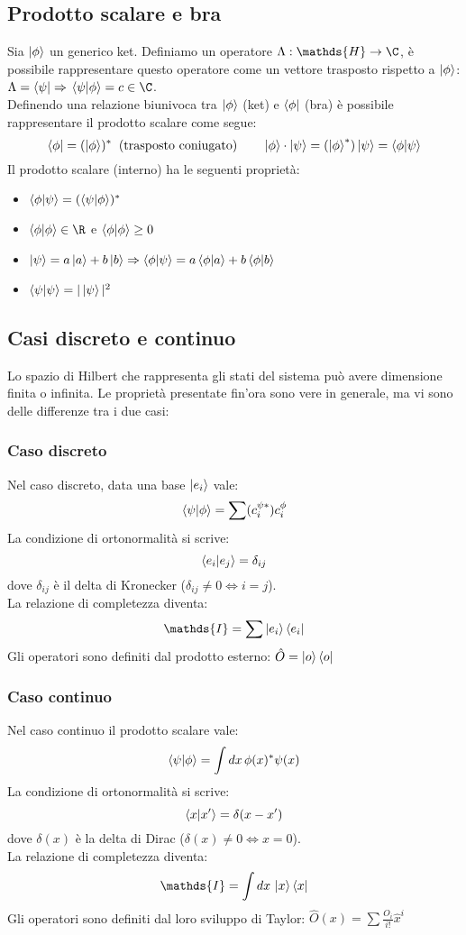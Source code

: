 \documentclass{article}
\begin{document}
\subsection{Prodotto scalare e bra}
Sia $\ket{\phi}$ un generico ket. Definiamo un operatore $\Lambda: \mathds{H}\rightarrow\C$, è possibile rappresentare questo operatore come un vettore trasposto rispetto a $\ket{\phi}$: $\Lambda=\bra{\psi} \Rightarrow$ $\bra{\psi}\ket{\phi}=c\in\C$.\\
Definendo una relazione biunivoca tra $\ket{\phi}$ (ket) e $\bra{\phi}$ (bra) è possibile rappresentare il prodotto scalare come segue:
$$ \bra{\phi}=(\ket{\phi})^* \;\; \text{(trasposto coniugato)} \qquad \ket{\phi}\cdot\ket{\psi}=(\ket{\phi}^*)\ket{\psi} = \bra{\phi}\ket{\psi} $$
Il prodotto scalare (interno) ha le seguenti proprietà:
\begin{itemize}
    \item $\bra{\phi}\ket{\psi}=(\bra{\psi}\ket{\phi})^*$
    \item $\bra{\phi}\ket{\phi}\in\R$ e $\bra{\phi}\ket{\phi}\geq0$
    \item $\ket{\psi}=a\ket{a}+b\ket{b}\Rightarrow\bra{\phi}\ket{\psi}=a\bra{\phi}\ket{a} + b \bra{\phi}\ket{b}$
    \item $\bra{\psi}\ket{\psi}=|\ket{\psi}|^2$
\end{itemize}

\subsection{Casi discreto e continuo}
Lo spazio di Hilbert che rappresenta gli stati del sistema può avere dimensione finita o infinita. Le proprietà presentate fin'ora sono vere in generale, ma vi sono delle differenze tra i due casi:
\subsubsection{Caso discreto}
Nel caso discreto, data una base $\ket{e_i}$ vale:
$$ \bra{\psi}\ket{\phi}=\sum (c^{\psi*}_i)c^\phi_i$$
La condizione di ortonormalità si scrive:
$$ \bra{e_i}\ket{e_j}=\delta_{ij} $$
dove $\delta_{ij}$ è il delta di Kronecker ($\delta_{i j}\neq0\Leftrightarrow i=j$).\\
La relazione di completezza diventa:
$$ \mathds{I} = \sum\ket{e_i}\bra{e_i} $$
Gli operatori sono definiti dal prodotto esterno:
$\hat{O}=\ket{o}\bra{o}$

\subsubsection{Caso continuo}
Nel caso continuo il prodotto scalare vale:
$$ \bra{\psi}\ket{\phi}=\int dx\,\phi(x)^*\psi(x) $$
La condizione di ortonormalità si scrive:
$$\bra{x}\ket{x'}=\delta(x-x')$$
dove $\delta(x)$ è la delta di Dirac ($\delta(x)\neq0\Leftrightarrow x=0$).\\
La relazione di completezza diventa:
$$ \mathds{I}=\int dx\,\ket{x}\bra{x} $$
Gli operatori sono definiti dal loro sviluppo di Taylor: $\hat{O}(x)=\sum \frac{O_i}{i!}\hat{x}^i$
\end{document}
